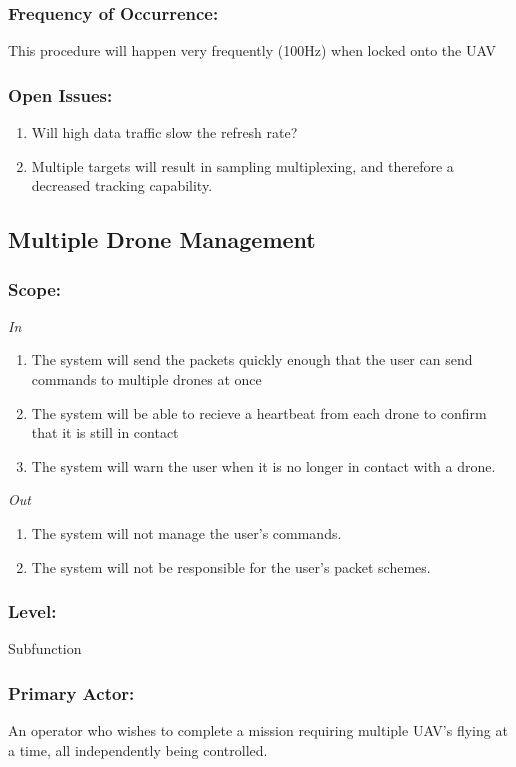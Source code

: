 \documentclass[ProductRequirements.tex]{subfiles}
\begin{document}
	\subsubsection*{Frequency of Occurrence:}
	This procedure will happen very frequently (100Hz) when locked onto the UAV
	\subsubsection*{Open Issues:}
	\begin{enumerate}\itemsep1pt
		\item Will high data traffic slow the refresh rate?
		\item Multiple targets will result in sampling multiplexing, and therefore a decreased tracking capability. 
	\end{enumerate}		
	
	
	\subsection{Multiple Drone Management}
	\subsubsection*{Scope:}
	\textit{In}
	\begin{enumerate}
		\item The system will send the packets quickly enough that the user can send commands to multiple drones at once
		\item The system will be able to recieve a heartbeat from each drone to confirm that it is still in contact
		\item The system will warn the user when it is no longer in contact with a drone.
	\end{enumerate}
	\textit{Out}
	\begin{enumerate}
		\item The system will not manage the user's commands.
		\item The system will not be responsible for the user's packet schemes.
	\end{enumerate}
	\subsubsection*{Level:}
	Subfunction
	\subsubsection*{Primary Actor:}
		An operator who wishes to complete a mission requiring multiple UAV's flying at a time, all independently being controlled.
\end{document}
